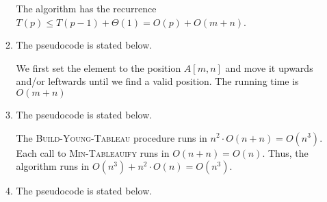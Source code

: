 \begin{enumerate}
\begin{framed}
\begin{enumerate}
The algorithm has the recurrence $T(p) \le T(p - 1) + \Theta(1) = O(p) + O(m + n)$.

\item The pseudocode is stated below.

\begin{algorithm}[H]
\SetAlgoNoEnd\DontPrintSemicolon
\BlankLine
{}
\end{algorithm}

We first set the element to the position $A[m, n]$ and move it upwards and/or
leftwards until we find a valid position. The running time is $O(m + n)$

\item The pseudocode is stated below.

\begin{algorithm}[H]
\SetAlgoNoEnd\DontPrintSemicolon
\BlankLine
{}
\end{algorithm}

\begin{algorithm}[H]
\SetAlgoNoEnd\DontPrintSemicolon
\BlankLine
{}
\end{algorithm}

The \textsc{Build-Young-Tableau} procedure runs in
$n^2 \cdot O(n + n) = O(n^3)$. Each call to \textsc{Min-Tableauify} runs in
$O(n + n) = O(n)$. Thus, the algorithm runs in
$O(n^3) + n^2 \cdot O(n) = O(n^3)$.

\item The pseudocode is stated below.


\end{enumerate}
\end{framed}
\end{enumerate}

